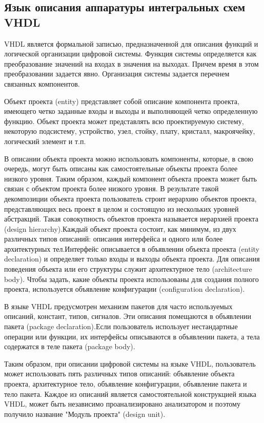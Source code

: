 \subsection{Язык описания аппаратуры интегральных схем VHDL}
\label{sub:practice:vhdl_overview}
VHDL является формальной записью, предназначенной для описания функций и логической организации цифровой системы. Функция системы определяется как преобразование значений на входах в значения на выходах. Причем время в этом преобразовании задается явно. Организация системы задается перечнем связанных компонентов.

Объект проекта (entity) представляет собой описание компонента проекта, имеющего четко заданные входы и выходы и выполняющей четко определенную функцию\cite{vhdl_entity}. Объект проекта может представлять всю проектируемую систему, некоторую подсистему, устройство, узел, стойку, плату, кристалл, макроячейку, логический элемент и т.п.

В описании объекта проекта можно использовать компоненты, которые, в свою очередь, могут быть описаны как самостоятельные объекты проекта более низкого уровня. Таким образом, каждый компонент объекта проекта может быть связан с объектом проекта более низкого уровня. В результате такой декомпозиции объекта проекта пользователь строит иерархию объектов проекта, представляющих весь проект в целом и состоящую из нескольких уровней абстракций. Такая совокупность объектов проекта называется иерархией проекта (design hierarchy).Каждый объект проекта состоит, как минимум, из двух различных типов описаний: описания интерфейса и одного или более архитектурных тел.Интерфейс описывается в объявлении объекта проекта  (entity declaration)  и определяет только входы и выходы объекта проекта. Для описания поведения объекта или его структуры служит архитектурное тело (architecture body). Чтобы задать, какие объекты проекта использованы для создания полного проекта, используется объявление конфигурации (configuration declaration).

В языке VHDL  предусмотрен механизм пакетов для часто используемых описаний, констант, типов, сигналов\cite{vhdl_packages}. Эти описания помещаются в объявлении пакета (package declaration).Если пользователь использует нестандартные операции или функции, их интерфейсы описываются в объявлении пакета, а тела содержатся в теле пакета (package body).

Таким образом, при описании цифровой системы на языке VHDL,  пользователь может использовать пять различных типов описаний: объявление объекта проекта, архитектурное тело, объявление конфигурации, объявление пакета и тело пакета. Каждое из описаний является самостоятельной конструкцией языка  VHDL, может быть независимо проанализировано анализатором и поэтому получило название "Модуль проекта" (design unit).

